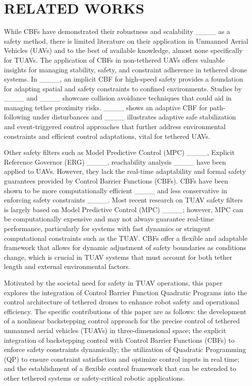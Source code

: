 \section{RELATED WORKS}
While CBFs have demonstrated their robustness and scalability ____ as a safety method, there is limited literature on their application in Unmanned Aerial Vehicles (UAVs) and to the best of available knowledge, almost none specifically for TUAVs. The application of CBFs in non-tethered UAVs offers valuable insights for managing stability, safety, and constraint adherence in tethered drone systems. In ____, an implicit CBF for high-speed safety provides a foundation for adapting spatial and safety constraints to confined environments. Studies by ____ and ____ showcase collision avoidance techniques that could aid in managing tether proximity risks. ____ shows an adaptive CBF for path-following under disturbances and ____ illustrates adaptive safe stabilization and event-triggered control approaches that further address environmental constraints and efficient control adaptations, vital for tethered UAVs. 

Other safety filters such as Model Predictive Control (MPC) ____, Explicit Reference Governor (ERG) ____, reachability analysis ____ have been applied to UAVs. However, they lack the real-time adaptability and formal safety guarantees provided by Control Barrier Functions (CBFs). CBFs have been shown to be more computationally efficient ____ and less conservative in enforcing safety constraints ____. Most recent research on TUAV safety filters is largely based on Model Predictive Control (MPC) ____; however, MPC can be computationally expensive and may not always guarantee real-time performance, particularly for systems with fast dynamics or stringent computational constraints such as the TUAV. CBFs offer a flexible and adaptable framework that allows for dynamic adjustment of safety boundaries as conditions change, which is crucial in TUAV systems that must account for both tether length and external environmental factors. 

Motivated by the societal need for safety in TUAV operations, this paper explores the integration of Control Barrier Function Quadratic Programs into the control architecture of tethered drones to enhance robot safety and operational efficiency. The specific contributions of this paper are as follows: the development of a nonlinear backstepping control approach for the precise control of tethered unmanned aerial vehicles (TUAVs) in three-dimensional space; the explicit integration of backstepping control with Control Barrier Functions (CBFs) to enforce safety constraints dynamically; the utilization of Quadratic Programming (QP) to ensure constraint satisfaction and optimize control inputs in real time; and the establishment of a flexible control framework that can be extended to other tethered systems or safety-critical robotic applications.